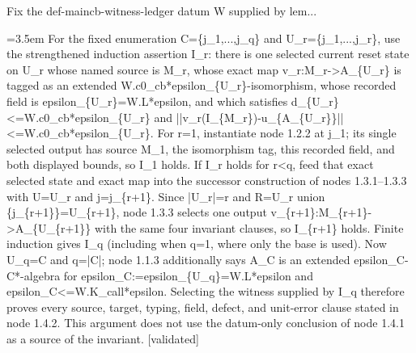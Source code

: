 \documentclass{article}
\newcommand{\step}[1]{\par\noindent\hangindent=3.5em\hangafter=1%
  \makebox[3.5em][l]{\textbf{#1.}}}
\newcommand{\steptag}[1]{\hfill{\small\textsf{[#1]}}}
\begin{document}
\begin{proofbox}{Fix the def-maincb-witness-ledger datum W supplied by lem...}
\step{1.4.2.1} For the fixed enumeration C=\{j\_1,...,j\_q\} and U\_r=\{j\_1,...,j\_r\}, use the strengthened induction assertion I\_r: there is one selected current reset state on U\_r whose named source is M\_r, whose exact map v\_r:M\_r->A\_\{U\_r\} is tagged as an extended W.c0\_cb*epsilon\_\{U\_r\}-isomorphism, whose recorded field is epsilon\_\{U\_r\}=W.L*epsilon, and which satisfies d\_\{U\_r\}<=W.c0\_cb*epsilon\_\{U\_r\} and ||v\_r(I\_\{M\_r\})-u\_\{A\_\{U\_r\}\}||<=W.c0\_cb*epsilon\_\{U\_r\}. For r=1, instantiate node 1.2.2 at j\_1; its single selected output has source M\_1, the isomorphism tag, this recorded field, and both displayed bounds, so I\_1 holds. If I\_r holds for r<q, feed that exact selected state and exact map into the successor construction of nodes 1.3.1--1.3.3 with U=U\_r and j=j\_\{r+1\}. Since |U\_r|=r and R=U\_r union \{j\_\{r+1\}\}=U\_\{r+1\}, node 1.3.3 selects one output v\_\{r+1\}:M\_\{r+1\}->A\_\{U\_\{r+1\}\} with the same four invariant clauses, so I\_\{r+1\} holds. Finite induction gives I\_q (including when q=1, where only the base is used). Now U\_q=C and q=|C|; node 1.1.3 additionally says A\_C is an extended epsilon\_C-C*-algebra for epsilon\_C:=epsilon\_\{U\_q\}=W.L*epsilon and epsilon\_C<=W.K\_call*epsilon. Selecting the witness supplied by I\_q therefore proves every source, target, typing, field, defect, and unit-error clause stated in node 1.4.2. This argument does not use the datum-only conclusion of node 1.4.1 as a source of the invariant. \steptag{validated} \\[4pt]
\end{proofbox}
\end{document}
